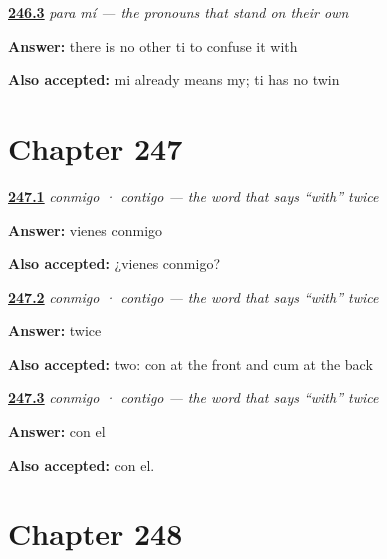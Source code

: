 \noindent\begin{minipage}[t]{\linewidth}
\raggedright
\hyperlink{review-ES-C64-para-mi-accent}{\textbf{246.3}} \emph{para mí — the pronouns that stand on their own}\par
\small \textbf{Answer:} there is no other ti to confuse it with\par
\footnotesize \textbf{Also accepted:} mi already means my; ti has no twin
\end{minipage}\par\medskip

\section*{Chapter 247}

\noindent\begin{minipage}[t]{\linewidth}
\raggedright
\hyperlink{review-ES-C64-conmigo-ask}{\textbf{247.1}} \emph{conmigo · contigo — the word that says \textquotedblleft{}with\textquotedblright{} twice}\par
\small \textbf{Answer:} vienes conmigo\par
\footnotesize \textbf{Also accepted:} ¿vienes conmigo?
\end{minipage}\par\medskip

\noindent\begin{minipage}[t]{\linewidth}
\raggedright
\hyperlink{review-ES-C64-conmigo-twice}{\textbf{247.2}} \emph{conmigo · contigo — the word that says \textquotedblleft{}with\textquotedblright{} twice}\par
\small \textbf{Answer:} twice\par
\footnotesize \textbf{Also accepted:} two: con at the front and cum at the back
\end{minipage}\par\medskip

\noindent\begin{minipage}[t]{\linewidth}
\raggedright
\hyperlink{review-ES-C64-conmigo-third}{\textbf{247.3}} \emph{conmigo · contigo — the word that says \textquotedblleft{}with\textquotedblright{} twice}\par
\small \textbf{Answer:} con el\par
\footnotesize \textbf{Also accepted:} con el.
\end{minipage}\par\medskip

\section*{Chapter 248}

